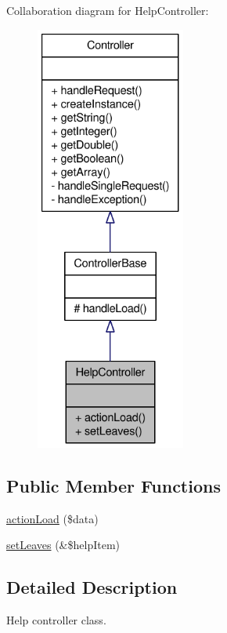 Collaboration diagram for HelpController:\nopagebreak
\begin{figure}[H]
\begin{center}
\leavevmode
\includegraphics[height=400pt]{classHelpController__coll__graph}
\end{center}
\end{figure}
\subsection*{Public Member Functions}
\begin{DoxyCompactItemize}
\item 
\hyperlink{classHelpController_a81ee93376ed7a4a11f1ff231d3c2d8fb}{actionLoad} (\$data)
\item 
\hyperlink{classHelpController_a5c4cbecffce428a0a98fe3cad78fd83d}{setLeaves} (\&\$helpItem)
\end{DoxyCompactItemize}


\subsection{Detailed Description}
Help controller class. 

